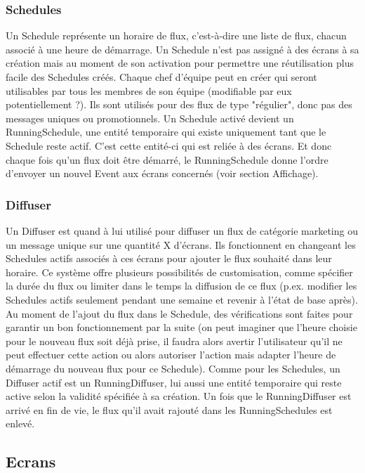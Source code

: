 \documentclass[french]{article}
\begin{document}
\subsubsection{Schedules}
Un Schedule représente un horaire de flux, c'est-à-dire une liste de flux, chacun associé à une heure de démarrage. Un Schedule n'est pas assigné à des écrans à sa création mais au moment de son activation pour permettre  une réutilisation plus facile des Schedules créés. Chaque chef d'équipe peut en créer qui seront utilisables par tous les membres de son équipe (modifiable par eux potentiellement ?). Ils sont utilisés pour des flux de type "régulier", donc pas des messages uniques ou promotionnels. \newline
Un Schedule activé devient un RunningSchedule, une entité temporaire qui existe uniquement tant que le Schedule reste actif. C'est cette entité-ci qui est reliée à des écrans. Et donc chaque fois qu'un flux doit être démarré, le RunningSchedule donne l'ordre d'envoyer un nouvel Event aux écrans concernés (voir section Affichage). 

\subsubsection{Diffuser}
Un Diffuser est quand à lui utilisé pour diffuser un flux de catégorie marketing ou un message unique sur une quantité X d'écrans. Ils fonctionnent en changeant les Schedules actifs associés à ces écrans pour ajouter le flux souhaité dans leur horaire. Ce système offre plusieurs possibilités de customisation, comme spécifier la durée du flux ou limiter dans le temps la diffusion de ce flux (p.ex. modifier les Schedules actifs seulement pendant une semaine et revenir à l'état de base après). Au moment de l'ajout du flux dans le Schedule, des vérifications sont faites pour garantir un bon fonctionnement par la suite (on peut imaginer que l'heure choisie pour le nouveau flux soit déjà prise, il faudra alors avertir l'utilisateur qu'il ne peut effectuer cette action ou alors autoriser l'action mais adapter l'heure de démarrage du nouveau flux pour ce Schedule). \newline
Comme pour les Schedules, un Diffuser actif est un RunningDiffuser, lui aussi une entité temporaire qui reste active selon la validité spécifiée à sa création. Un fois que le RunningDiffuser est arrivé en fin de vie, le flux qu'il avait rajouté dans les RunningSchedules est enlevé.


\subsection{Ecrans}
\end{document}
